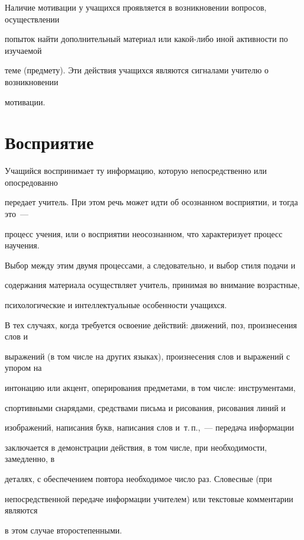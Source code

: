 Наличие мотивации у учащихся проявляется в возникновении вопросов, осуществлении 


попыток найти дополнительный материал или какой-либо иной активности по изучаемой 


теме (предмету). Эти действия учащихся являются сигналами учителю о возникновении 


мотивации.





\section{Восприятие}





Учащийся воспринимает ту информацию, которую непосредственно или опосредованно 


передает учитель. При этом речь может идти об осознанном восприятии, и тогда это~--- 


процесс учения, или о восприятии неосознанном, что характеризует процесс научения. 


Выбор между этим двумя процессами, а следовательно, и выбор стиля подачи и 


содержания материала осуществляет учитель, принимая во внимание возрастные, 


психологические и интеллектуальные особенности учащихся.





В тех случаях, когда требуется освоение действий: движений, поз, произнесения слов и 


выражений (в том числе на других языках), произнесения слов и выражений с упором на 


интонацию или акцент, оперирования предметами, в том числе: инструментами, 


спортивными снарядами, средствами письма и рисования, рисования линий и 


изображений, написания букв, написания слов и~т.\,п.,~--- передача информации 


заключается в демонстрации действия, в том чис\-ле, при необходимости, замедленно, в 


деталях, с обеспечением повтора необходимое чис\-ло раз. Словесные (при 


непосредственной передаче информации учителем) или текстовые комментарии являются 


в этом случае второстепенными.





